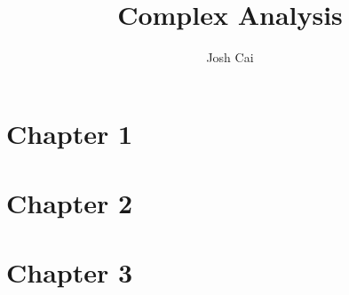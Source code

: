 \documentclass{article}
\begin{document}
\title{Complex Analysis}
\author{Josh Cai}

\maketitle  

\section{Chapter 1}


\section{Chapter 2}


\section{Chapter 3}

\end{document}
